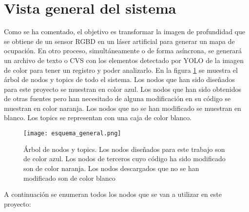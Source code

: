 \section{Vista general del sistema}

Como se ha comentado, el objetivo es transformar la imagen de profundidad que se obtiene de un sensor RGBD en un láser artificial para generar un mapa de ocupación. En otro proceso, simultáneamente o de forma asíncrona, se generará un archivo de texto o CVS con los elementos detectado por YOLO de la imagen de color para tener un registro y poder analizarlo. En la figura \ref{fig:esq_general} se muestra el árbol de nodos y topics de todo el sistema. Los nodos que han sido diseñados para este proyecto se muestran en color azul. Los nodos que han sido obtenidos de otras fuentes pero han necesitado de alguna modificación en su código se muestran en color naranja. Los nodos que no se han modificado se muestran en blanco. Los topics se representan con una caja de color blanco.\\

\begin{figure}[h]
	\begin{center} 
		\texttt{[image: esquema\_general.png]}
	\end{center}
	\caption{Árbol de nodos y topics. Los nodos diseñados para este trabajo son de color azul. Los nodos de terceros cuyo código ha sido modificado son de color naranja. Los nodos descargados que no se han modificado son de color blanco}
	\label{fig:esq_general}
\end{figure}

A continuación se enumeran todos los nodos que se van a utilizar en este proyecto:

